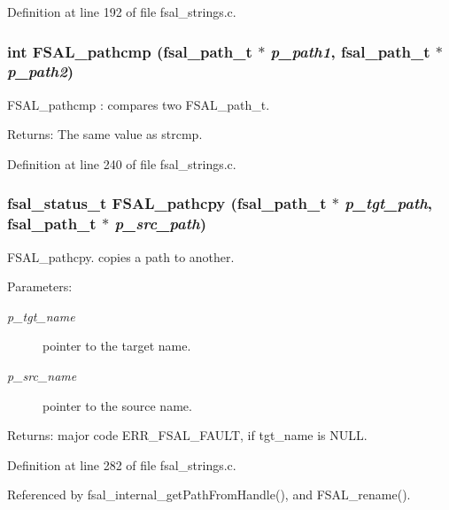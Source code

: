 Definition at line 192 of file fsal\_\-strings.c.
\subsubsection{\setlength{\rightskip}{0pt plus 5cm}int FSAL\_\-pathcmp (fsal\_\-path\_\-t $\ast$ {\em p\_\-path1}, fsal\_\-path\_\-t $\ast$ {\em p\_\-path2})}\label{group__FSALNameFunctions_ga5}


FSAL\_\-pathcmp : compares two FSAL\_\-path\_\-t.

\begin{Desc}
\item[Returns:]The same value as strcmp. \end{Desc}


Definition at line 240 of file fsal\_\-strings.c.
\subsubsection{\setlength{\rightskip}{0pt plus 5cm}fsal\_\-status\_\-t FSAL\_\-pathcpy (fsal\_\-path\_\-t $\ast$ {\em p\_\-tgt\_\-path}, fsal\_\-path\_\-t $\ast$ {\em p\_\-src\_\-path})}\label{group__FSALNameFunctions_ga7}


FSAL\_\-pathcpy. copies a path to another.

\begin{Desc}
\item[Parameters:]
\begin{description}
\item[{\em p\_\-tgt\_\-name}]pointer to the target name. \item[{\em p\_\-src\_\-name}]pointer to the source name. \end{description}
\end{Desc}
\begin{Desc}
\item[Returns:]major code ERR\_\-FSAL\_\-FAULT, if tgt\_\-name is NULL. \end{Desc}


Definition at line 282 of file fsal\_\-strings.c.

Referenced by fsal\_\-internal\_\-get\-Path\-From\-Handle(), and FSAL\_\-rename().
